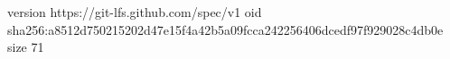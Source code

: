 version https://git-lfs.github.com/spec/v1
oid sha256:a8512d750215202d47e15f4a42b5a09fcca242256406dcedf97f929028c4db0e
size 71

